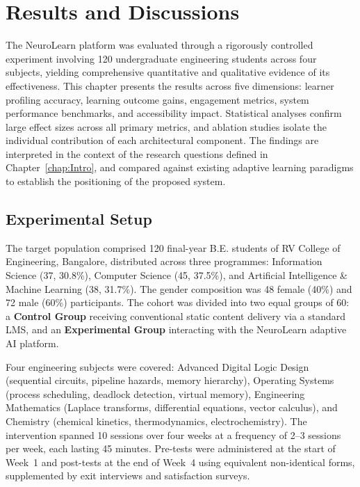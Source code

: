 \chapter{Results and Discussions}

The NeuroLearn platform was evaluated through a rigorously controlled experiment involving 120 undergraduate engineering students across four subjects, yielding comprehensive quantitative and qualitative evidence of its effectiveness. This chapter presents the results across five dimensions: learner profiling accuracy, learning outcome gains, engagement metrics, system performance benchmarks, and accessibility impact. Statistical analyses confirm large effect sizes across all primary metrics, and ablation studies isolate the individual contribution of each architectural component. The findings are interpreted in the context of the research questions defined in Chapter~\ref{chap:Intro}, and compared against existing adaptive learning paradigms to establish the positioning of the proposed system.

\section{Experimental Setup}

The target population comprised 120 final-year B.E. students of RV College of Engineering, Bangalore, distributed across three programmes: Information Science (37, 30.8\%), Computer Science (45, 37.5\%), and Artificial Intelligence \& Machine Learning (38, 31.7\%). The gender composition was 48 female (40\%) and 72 male (60\%) participants. The cohort was divided into two equal groups of 60: a \textbf{Control Group} receiving conventional static content delivery via a standard LMS, and an \textbf{Experimental Group} interacting with the NeuroLearn adaptive AI platform.

Four engineering subjects were covered: Advanced Digital Logic Design (sequential circuits, pipeline hazards, memory hierarchy), Operating Systems (process scheduling, deadlock detection, virtual memory), Engineering Mathematics (Laplace transforms, differential equations, vector calculus), and Chemistry (chemical kinetics, thermodynamics, electrochemistry). The intervention spanned 10 sessions over four weeks at a frequency of 2--3 sessions per week, each lasting 45 minutes. Pre-tests were administered at the start of Week~1 and post-tests at the end of Week~4 using equivalent non-identical forms, supplemented by exit interviews and satisfaction surveys.

